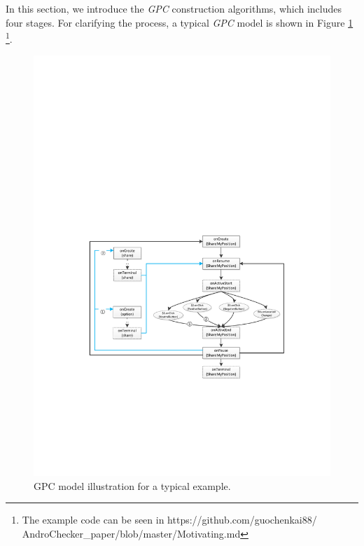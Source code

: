 In this section, we introduce the \textit{GPC} construction algorithms, %
which includes four stages. For clarifying the process, a typical \textit{GPC} model is shown in Figure \ref{fig:motivationGPC} \footnote{The example code can be seen in https://github.com/guochenkai88/\\AndroChecker\_paper/blob/master/Motivating.md}. 
\begin{figure}[htbp]  
  \centering  
  \includegraphics[width=1\linewidth]{pic/motivationGPM.pdf}  
  \caption{GPC model illustration for a typical example.}  
  \label{fig:motivationGPC}  
\end{figure}
